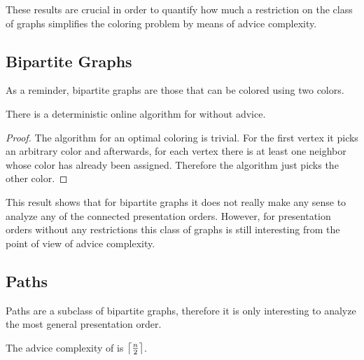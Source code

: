 These results are crucial in order to quantify how much a restriction on
the class of graphs simplifies the coloring problem by means of advice
complexity.

\subsection{Bipartite Graphs}

As a reminder, bipartite graphs are those that can be colored using two
colors.


\begin{theorem}\label{theorem:bipartite-connected}
    There is a deterministic online algorithm for
     without advice.
\end{theorem}

\begin{proof}
    The algorithm for an optimal coloring is trivial. For the first vertex
    it picks an arbitrary color and afterwards, for each vertex there is
    at least one neighbor whose color has already been assigned. Therefore
    the algorithm just picks the other color.
\end{proof}

This result shows that for bipartite graphs it does not really make any
sense to analyze any of the connected presentation orders. However, for
presentation orders without any restrictions this class of graphs is still
interesting from the point of view of advice complexity.

\subsection{Paths}

Paths are a subclass of bipartite graphs, therefore it is only interesting
to analyze the most general presentation order.

\begin{theorem}\label{theorem:paths-any}
    The advice complexity of  is
    $\ceil*{\frac{n}{2}}$.
\end{theorem}

